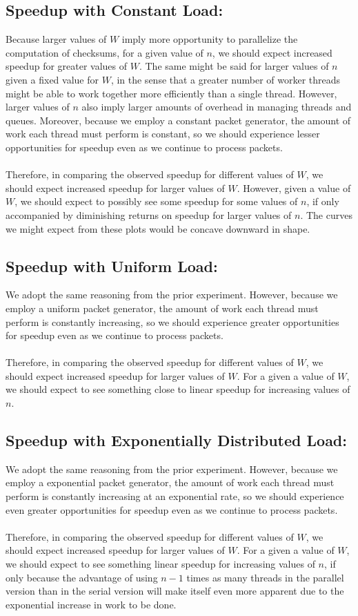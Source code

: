 \documentclass[]{article}
\begin{document}
\subsection{Speedup with Constant Load:}
Because larger values of $W$ imply more opportunity to parallelize the computation of checksums, for a given value of $n$, we should expect increased speedup for greater values of $W$. The same might be said for larger values of $n$ given a fixed value for $W$, in the sense that a greater number of worker threads might be able to work together more efficiently than a single thread. However, larger values of $n$ also imply larger amounts of overhead in managing threads and queues. Moreover, because we employ a constant packet generator, the amount of work each thread must perform is constant, so we should experience lesser opportunities for speedup even as we continue to process packets.
\\\\
Therefore, in comparing the observed speedup for different values of $W$, we should expect increased speedup for larger values of $W$. However, given a value of $W$, we should expect to possibly see some speedup for some values of $n$, if only accompanied by diminishing returns on speedup for larger values of $n$. The curves we might expect from these plots  would be concave downward in shape.
\subsection{Speedup with Uniform Load:}
We adopt the same reasoning from the prior experiment. However, because we employ a uniform packet generator, the amount of work each thread must perform is constantly increasing, so we should experience greater opportunities for speedup even as we continue to process packets.
\\\\
Therefore, in comparing the observed speedup for different values of $W$, we should expect increased speedup for larger values of $W$. For a given a value of $W$, we should expect to see something close to linear speedup for increasing values of $n$.

\subsection{Speedup with Exponentially Distributed Load:}
We adopt the same reasoning from the prior experiment. However, because we employ a exponential packet generator, the amount of work each thread must perform is constantly increasing at an exponential rate, so we should experience even greater opportunities for speedup even as we continue to process packets.
\\\\
Therefore, in comparing the observed speedup for different values of $W$, we should expect increased speedup for larger values of $W$. For a given a value of $W$, we should expect to see something linear speedup for increasing values of $n$, if only because the advantage of using $n - 1$ times as many threads in the parallel version than in the serial version will make itself even more apparent due to the exponential increase in work to be done.
\end{document}
